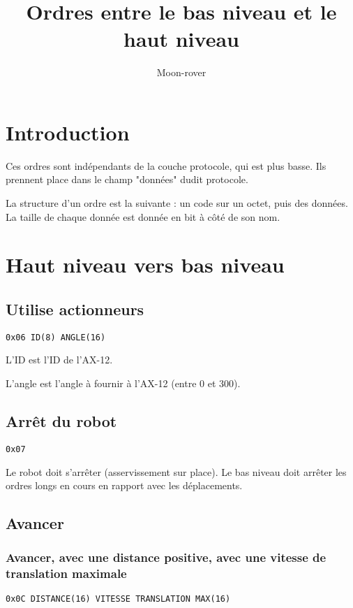 \documentclass[a4paper, 12pt]{article}
\title{Ordres entre le bas niveau et le haut niveau}
\author{Moon-rover}
\date{}
\begin{document}
\maketitle

\pagestyle{plain}

\tableofcontents


\section{Introduction}

Ces ordres sont indépendants de la couche protocole, qui est plus basse.
Ils prennent place dans le champ "données" dudit protocole.

La structure d'un ordre est la suivante : un code sur un octet, puis des données. La taille de chaque donnée est donnée en bit à côté de son nom.

\section{Haut niveau vers bas niveau}

\subsection{Utilise actionneurs}
\texttt{0x06 ID(8) ANGLE(16)}

L'ID est l'ID de l'AX-12.

L'angle est l'angle à fournir à l'AX-12 (entre 0 et 300).

\subsection{Arrêt du robot}
\texttt{0x07}
   
Le robot doit s'arrêter (asservissement sur place). Le bas niveau doit arrêter les ordres longs en cours en rapport avec les déplacements.

\subsection{Avancer}

\subsubsection{Avancer, avec une distance positive, avec une vitesse de translation maximale}
    \texttt{0x0C DISTANCE(16) VITESSE  TRANSLATION  MAX(16)}
\end{document}
